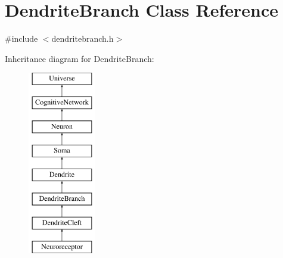 \hypertarget{classDendriteBranch}{}\section{Dendrite\+Branch Class Reference}
\label{classDendriteBranch}


{\ttfamily \#include $<$dendritebranch.\+h$>$}

Inheritance diagram for Dendrite\+Branch\+:\begin{figure}[H]
\begin{center}
\leavevmode
\includegraphics[height=8.000000cm]{classDendriteBranch}
\end{center}
\end{figure}
